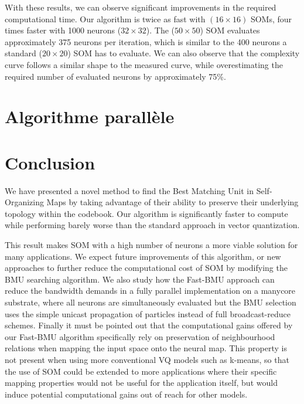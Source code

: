 	With these results, we can observe significant improvements in the required computational time. Our algorithm is twice as fast with $(16\times16)$ SOMs, four times faster with 1000 neurons ($32\times32$). The ($50\times50$) SOM evaluates approximately 375 neurons per iteration, which is similar to the 400 neurons a standard ($20\times20$) SOM has to evaluate. We can also observe that the complexity curve follows a similar shape to the measured curve, while overestimating the required number of evaluated neurons by approximately 75\%.	

	\newpage
	\section{Algorithme parallèle}
	\section{Conclusion}

	We have presented a novel method to find the Best Matching Unit in Self-Organizing Maps by taking advantage of their ability to preserve their underlying topology within the codebook. Our algorithm is significantly faster to compute while performing barely worse than the standard approach in vector quantization. %

	This result makes SOM with a high number of neurons a more viable solution for many applications. We expect future improvements of this algorithm, or new approaches to further reduce the computational cost of SOM by modifying the BMU searching algorithm. We also study how the Fast-BMU approach can reduce the bandwidth demands in a fully parallel implementation on a manycore substrate, where all neurons are simultaneously evaluated but the BMU selection uses the simple unicast propagation of particles instead of full broadcast-reduce schemes. Finally it must be pointed out that the computational gains offered by our Fast-BMU algorithm specifically rely on preservation of neighbourhood relations when mapping the input space onto the neural map. This property is not present when using more conventional VQ models such as k-means, so that the use of SOM could be extended to more applications where their specific mapping properties would not be useful for the application itself, but would induce potential computational gains out of reach for other models.
		

